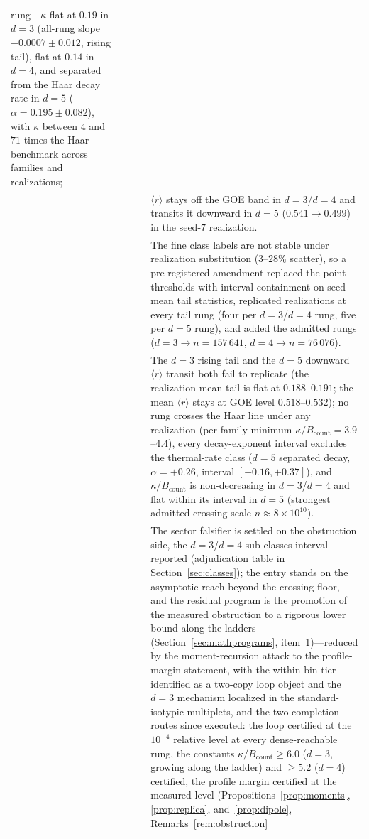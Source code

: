 \documentclass[11pt,a4paper]{article}
\theoremstyle{plain}
\theoremstyle{definition}
\theoremstyle{remark}
\begin{document}
\begin{longtable}{@{}p{}p{}p{}p{}p{}@{}}
rung---$\kappa$ flat at $0.19$ in $d=3$ (all-rung slope
$-0.0007\pm0.012$, rising tail), flat at $0.14$ in $d=4$, and separated
from the Haar decay rate in $d=5$ ($\alpha=0.195\pm0.082$), with $\kappa$
between $4$ and $71$ times the Haar benchmark across families and
realizations;\\
 & & & & $\langle r\rangle$ stays off the GOE band in $d=3$/$d=4$
and transits it downward in $d=5$ ($0.541\to0.499$) in the seed-$7$
realization.\\
 & & & & The fine class labels are not stable under realization
substitution ($3$--$28\%$ scatter), so a pre-registered amendment
replaced the point thresholds with interval containment on seed-mean
tail statistics, replicated realizations at every tail rung (four per
$d=3$/$d=4$ rung, five per $d=5$ rung), and added the admitted rungs
($d=3\to n=157\,641$, $d=4\to n=76\,076$).\\
 & & & & The $d=3$ rising tail and
the $d=5$ downward $\langle r\rangle$ transit both fail to replicate
(the realization-mean tail is flat at $0.188$--$0.191$; the mean
$\langle r\rangle$ stays at GOE level $0.518$--$0.532$); no rung
crosses the Haar line under any realization (per-family minimum
$\kappa/B_{\mathrm{count}}=3.9$--$4.4$), every decay-exponent interval
excludes the thermal-rate class ($d=5$ separated decay, $\alpha=+0.26$,
interval $[+0.16,+0.37]$), and $\kappa/B_{\mathrm{count}}$ is
non-decreasing in $d=3$/$d=4$ and flat within its interval in $d=5$
(strongest admitted crossing scale $n\approx8\times10^{10}$).\\
 & & & & The
sector falsifier is settled on the obstruction side, the $d=3$/$d=4$
sub-classes interval-reported (adjudication table in Section~\ref{sec:classes}); the
entry stands on the asymptotic reach beyond the crossing floor, and the residual
program is the promotion of the measured obstruction to a rigorous lower bound along
the ladders (Section~\ref{sec:mathprograms}, item~1)---reduced by the
moment-recursion attack to the profile-margin statement, with the within-bin tier
identified as a two-copy loop object and the $d=3$ mechanism localized in the
standard-isotypic multiplets, and the two completion routes since executed: the loop
certified at the $10^{-4}$ relative level at every dense-reachable rung, the constants
$\kappa/B_{\mathrm{count}}\ge6.0$ ($d=3$, growing along the ladder) and $\ge5.2$
($d=4$) certified, the profile margin certified at the measured level
(Propositions~\ref{prop:moments}, \ref{prop:replica}, and~\ref{prop:dipole},
Remarks~\ref{rem:obstruction}

\end{longtable}
\end{document}
